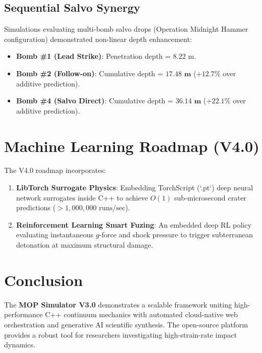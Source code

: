 \documentclass[journal,10pt,twocolumn]{IEEEtran}
\begin{document}
\subsection{Sequential Salvo Synergy}
Simulations evaluating multi-bomb salvo drops (Operation Midnight Hammer configuration) demonstrated non-linear depth enhancement:
\begin{itemize}
    \item \textbf{Bomb \#1 (Lead Strike)}: Penetration depth = $8.22\text{ m}$.
    \item \textbf{Bomb \#2 (Follow-on)}: Cumulative depth = $\mathbf{17.48\text{ m}}$ ($+12.7\%$ over additive prediction).
    \item \textbf{Bomb \#4 (Salvo Direct)}: Cumulative depth = $\mathbf{36.14\text{ m}}$ ($+22.1\%$ over additive prediction).
\end{itemize}

\section{Machine Learning Roadmap (V4.0)}
The V4.0 roadmap incorporates:
\begin{enumerate}
    \item \textbf{LibTorch Surrogate Physics}: Embedding TorchScript (`.pt`) deep neural network surrogates inside C++ to achieve $O(1)$ sub-microsecond crater predictions ($> 1,000,000\text{ runs/sec}$).
    \item \textbf{Reinforcement Learning Smart Fuzing}: An embedded deep RL policy evaluating instantaneous $g$-force and shock pressure to trigger subterranean detonation at maximum structural damage.
\end{enumerate}

\section{Conclusion}
The \textbf{MOP Simulator V3.0} demonstrates a scalable framework uniting high-performance C++ continuum mechanics with automated cloud-native web orchestration and generative AI scientific synthesis. The open-source platform provides a robust tool for researchers investigating high-strain-rate impact dynamics.
\end{document}
